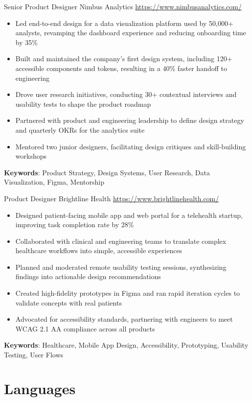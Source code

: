 \documentclass[a4paper, serif, 10pt]{moderncv}
\begin{document}
        {Senior Product Designer}
        {Nimbus Analytics}
        {\url{https://www.nimbusanalytics.com/}}
        {}
        {\begin{itemize}
\item Led end-to-end design for a data visualization platform used by 50,000+ analysts, revamping the dashboard experience and reducing onboarding time by 35\%
\item Built and maintained the company’s first design system, including 120+ accessible components and tokens, resulting in a 40\% faster handoff to engineering
\item Drove user research initiatives, conducting 30+ contextual interviews and usability tests to shape the product roadmap
\item Partnered with product and engineering leadership to define design strategy and quarterly OKRs for the analytics suite
\item Mentored two junior designers, facilitating design critiques and skill-building workshops
\end{itemize}
\textbf{Keywords}: Product Strategy, Design Systems, User Research, Data Visualization, Figma, Mentorship}

        {Product Designer}
        {Brightline Health}
        {\url{https://www.brightlinehealth.com/}}
        {}
        {\begin{itemize}
\item Designed patient-facing mobile app and web portal for a telehealth startup, improving task completion rate by 28\%
\item Collaborated with clinical and engineering teams to translate complex healthcare workflows into simple, accessible experiences
\item Planned and moderated remote usability testing sessions, synthesizing findings into actionable design recommendations
\item Created high-fidelity prototypes in Figma and ran rapid iteration cycles to validate concepts with real patients
\item Advocated for accessibility standards, partnering with engineers to meet WCAG 2.1 AA compliance across all products
\end{itemize}
\textbf{Keywords}: Healthcare, Mobile App Design, Accessibility, Prototyping, Usability Testing, User Flows}
\section{Languages}
\end{document}
